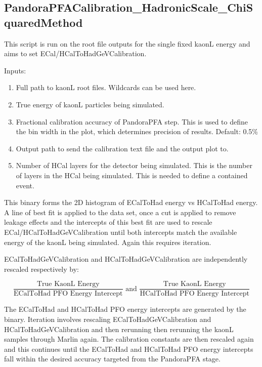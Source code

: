 \documentclass[11pt, oneside]{article}   	%
\begin{document}
\subsection{PandoraPFACalibration\_HadronicScale\_ChiSquaredMethod}

This script is run on the root file outputs for the single fixed kaonL energy and aims to set ECal/HCalToHadGeVCalibration.

Inputs:
\begin{enumerate}
\item Full path to kaonL root files.  Wildcards can be used here.
\item True energy of kaonL particles being simulated.
\item Fractional calibration accuracy of PandoraPFA step.  This is used to define the bin width in the plot, which determines precision of results.  Default: 0.5\%
\item Output path to send the calibration text file and the output plot to.
\item Number of HCal layers for the detector being simulated.  This is the number of layers in the HCal being simulated.  This is needed to define a contained event.
\end{enumerate}

This binary forms the 2D histogram of ECalToHad energy vs HCalToHad energy.  A line of best fit is applied to the data set, once a cut is applied to remove leakage effects and the intercepts of this best fit are used to rescale ECal/HCalToHadGeVCalibration until both intercepts match the available energy of the kaonL being simulated.  Again this requires iteration.  

ECalToHadGeVCalibration and HCalToHadGeVCalibration are independently rescaled respectively by:

\begin{equation}
\frac{\text{True KaonL Energy}}{\text{ECalToHad PFO Energy Intercept}} \text{ and } \frac{\text{True KaonL Energy}}{\text{HCalToHad PFO Energy Intercept}} 
\end{equation}

The ECalToHad and HCalToHad PFO energy intercepts are generated by the binary.  Iteration involves rescaling ECalToHadGeVCalibration and HCalToHadGeVCalibration and then rerunning then rerunning the kaonL samples through Marlin again.  The calibration constants are then rescaled again and this continues until the ECalToHad and HCalToHad PFO energy intercepts fall within the desired accuracy targeted from the PandoraPFA stage.
\end{document}
